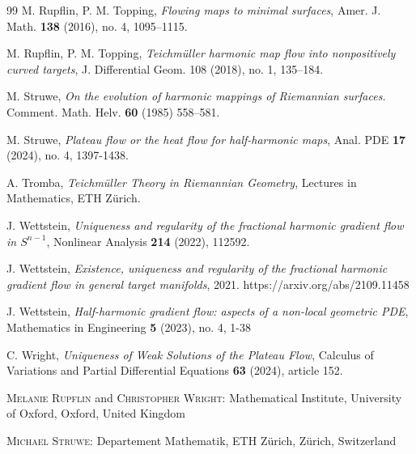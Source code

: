 \documentclass[10pt,reqno]{amsart}
\theoremstyle{plain}
\theoremstyle{definition}
\numberwithin{equation}{section}
\begin{document}
\begin{thebibliography}{99}
 M. Rupflin, P. M. Topping, \emph{Flowing maps to minimal surfaces}, Amer. J. Math. \textbf{138} (2016), no. 4, 1095--1115.

  M. Rupflin, P. M. Topping, \emph{Teichmüller harmonic map flow into nonpositively curved targets}, J. Differential Geom. 108 (2018), no. 1, 135–184.


 M. Struwe, \emph{On the evolution of harmonic mappings of Riemannian surfaces.\/} Comment. Math. Helv. {\bf 60} (1985) 558--581.

M. Struwe,
\textit{
Plateau flow or the heat flow for half-harmonic maps},
Anal. PDE \textbf{17} (2024), no. 4, 1397-1438.

 A. Tromba, \textit{Teichm\"uller Theory in Riemannian Geometry}, Lectures in Mathematics, ETH Z\"urich.


 J. Wettstein, \emph{Uniqueness and regularity of the fractional harmonic gradient flow in $S^{n-1}$}, Nonlinear Analysis \textbf{214} (2022), 112592. 

 J. Wettstein, \emph{Existence, uniqueness and regularity of the fractional harmonic gradient flow in general target manifolds}, 2021.
https://arxiv.org/abs/2109.11458

 J. Wettstein, \emph{Half-harmonic gradient flow: aspects of a non-local geometric PDE}, Mathematics in Engineering \textbf{5} (2023), no. 4, 1-38

 C. Wright, \emph{Uniqueness of Weak Solutions of the Plateau Flow}, Calculus of Variations and Partial Differential Equations \textbf{63} (2024), article 152. 
\end{thebibliography}


\textsc{Melanie Rupflin} and \textsc{Christopher Wright}: Mathematical Institute, University of Oxford, Oxford, United Kingdom

\textsc{Michael Struwe}: Departement Mathematik, ETH Z\"urich, Z\"urich, Switzerland
\end{document}
